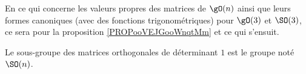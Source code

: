 En ce qui concerne les valeurs propres des matrices de \( \gO(n)\) ainsi que leurs formes canoniques (avec des fonctions trigonométriques) pour \( \gO(3)\) et \( \SO(3)\), ce sera pour la proposition \ref{PROPooVEJGooWnqtMm} et ce qui s'ensuit.

\begin{definition}      \label{DEFooJLNQooBKTYUy}
    Le sous-groupe des matrices orthogonales de déterminant \( 1\) est le groupe  noté \( \SO(n)\).
\end{definition}

